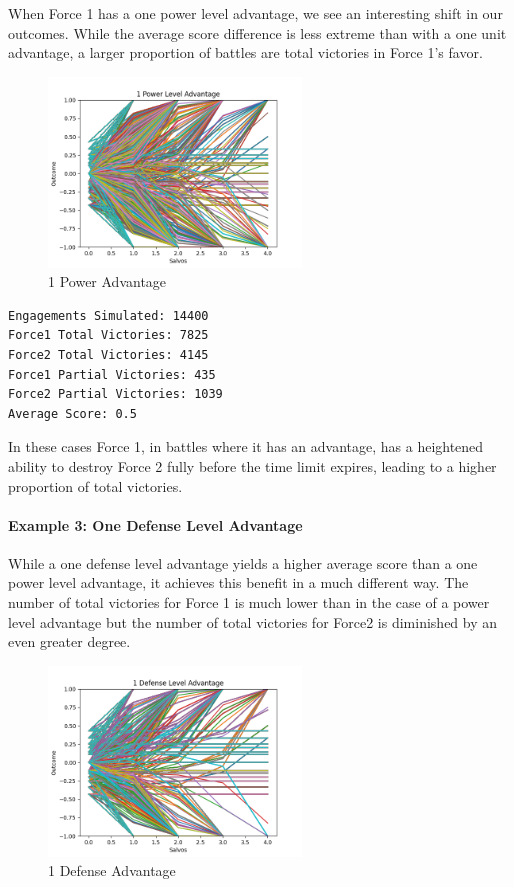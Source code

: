 When Force 1 has a one power level advantage, we see an interesting
shift in our outcomes. While the average score difference is less
extreme than with a one unit advantage, a larger proportion of battles
are total victories in Force 1's favor.

\begin{figure}
\hypertarget{fig:refname}{%
\centering
\includegraphics[width=0.6\textwidth,height=\textheight]{figures/1PowerAdv.png}
\caption{1 Power Advantage}\label{fig:refname}
}
\end{figure}

\begin{verbatim}
Engagements Simulated: 14400
Force1 Total Victories: 7825
Force2 Total Victories: 4145
Force1 Partial Victories: 435
Force2 Partial Victories: 1039
Average Score: 0.5
\end{verbatim}

In these cases Force 1, in battles where it has an advantage, has a
heightened ability to destroy Force 2 fully before the time limit
expires, leading to a higher proportion of total victories.

\hypertarget{example-3-one-defense-level-advantage}{%
\paragraph{Example 3: One Defense Level
Advantage}\label{example-3-one-defense-level-advantage}}

While a one defense level advantage yields a higher average score than a
one power level advantage, it achieves this benefit in a much different
way. The number of total victories for Force 1 is much lower than in the
case of a power level advantage but the number of total victories for
Force2 is diminished by an even greater degree.

\begin{figure}
\hypertarget{fig:refname}{%
\centering
\includegraphics[width=0.6\textwidth,height=\textheight]{figures/1DefenseAdv.png}
\caption{1 Defense Advantage}\label{fig:refname}
}
\end{figure}

